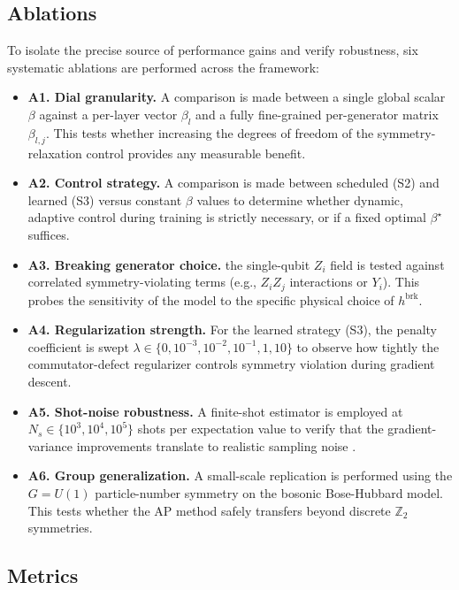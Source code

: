 \documentclass[pdflatex,sn-mathphys-num]{sn-jnl}
\theoremstyle{thmstyleone}
\theoremstyle{thmstyletwo}
\theoremstyle{thmstylethree}
\begin{document}
\subsection{Ablations}

To isolate the precise source of performance gains and verify robustness, six systematic ablations are performed across the framework:
\begin{itemize}
    \item \textbf{A1. Dial granularity.} A comparison is made between a single global scalar $\beta$ against a per-layer vector $\beta_l$ and a fully fine-grained per-generator matrix $\beta_{l,j}$. This tests whether increasing the degrees of freedom of the symmetry-relaxation control provides any measurable benefit.
    \item \textbf{A2. Control strategy.} A comparison is made between scheduled (S2) and learned (S3) versus constant $\beta$ values to determine whether dynamic, adaptive control during training is strictly necessary, or if a fixed optimal $\beta^\star$ suffices.
    \item \textbf{A3. Breaking generator choice.} the single-qubit $Z_i$ field is tested against correlated symmetry-violating terms (e.g., $Z_iZ_j$ interactions or $Y_i$). This probes the sensitivity of the model to the specific physical choice of $h^{\text{brk}}$.
    \item \textbf{A4. Regularization strength.} For the learned strategy (S3), the penalty coefficient is swept $\lambda \in \{0, 10^{-3}, 10^{-2}, 10^{-1}, 1, 10\}$ to observe how tightly the commutator-defect regularizer controls symmetry violation during gradient descent.
    \item \textbf{A5. Shot-noise robustness.} A finite-shot estimator is employed at $N_s \in \{10^3, 10^4, 10^5\}$ shots per expectation value to verify that the gradient-variance improvements translate to realistic sampling noise \cite{wang2021noise}.
    \item \textbf{A6. Group generalization.} A small-scale replication is performed using the $G = U(1)$ particle-number symmetry on the bosonic Bose-Hubbard model. This tests whether the AP method safely transfers beyond discrete $\mathbb{Z}_2$ symmetries.
\end{itemize}

\subsection{Metrics}
\end{document}
